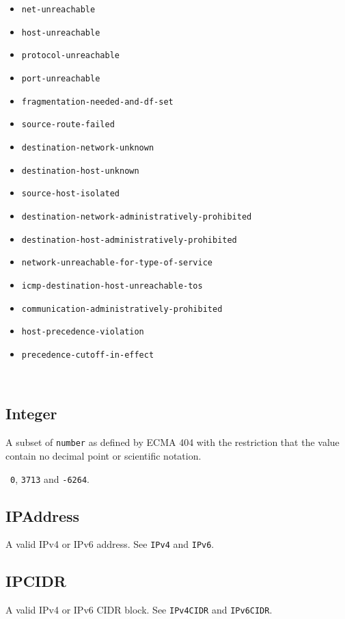 \documentclass[10pt]{article}
\begin{document}
\begin{itemize}
\item {\tt net-unreachable}
\item {\tt host-unreachable}
\item {\tt protocol-unreachable}
\item {\tt port-unreachable}
\item {\tt fragmentation-needed-and-df-set}
\item {\tt source-route-failed}
\item {\tt destination-network-unknown}
\item {\tt destination-host-unknown}
\item {\tt source-host-isolated}
\item {\tt destination-network-administratively-prohibited}
\item {\tt destination-host-administratively-prohibited}
\item {\tt network-unreachable-for-type-of-service}
\item {\tt icmp-destination-host-unreachable-tos}
\item {\tt communication-administratively-prohibited}
\item {\tt host-precedence-violation}
\item {\tt precedence-cutoff-in-effect}
\end{itemize}

\\



\subsection{Integer}
A subset of {\tt number} as defined by ECMA 404 with the restriction
that the value contain no decimal point or scientific notation.

\example\ {\tt 0}, {\tt 3713} and {\tt -6264}.






\subsection{IPAddress}
A valid IPv4 or IPv6 address.  See {\tt IPv4} and {\tt IPv6}.


\subsection{IPCIDR}
A valid IPv4 or IPv6 CIDR block.  See {\tt IPv4CIDR} and {\tt IPv6CIDR}.
\end{document}

